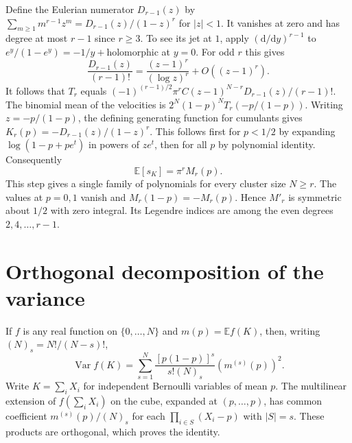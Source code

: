 \documentclass[11pt]{article}
\newcommand{\dd}{\mathrm d}
\newcommand{\Var}{\operatorname{Var}}
\newcommand{\E}{\mathbb E}
\begin{document}
Define the Eulerian numerator $D_{r-1}(z)$ by
$\sum_{m\ge1}m^{r-1}z^m=D_{r-1}(z)/(1-z)^r$ for $|z|<1$.
It vanishes at zero and has degree at most $r-1$ since $r\ge3$.
To see its jet at $1$, apply $(\dd/\dd y)^{r-1}$ to
$e^y/(1-e^y)=-1/y+\text{holomorphic}$ at $y=0$.
For odd $r$ this gives
\[
 \frac{D_{r-1}(z)}{(r-1)!}
 =\frac{(z-1)^r}{(\log z)^r}+O((z-1)^r).
\]
It follows that $T_r$ equals
$(-1)^{(r-1)/2}\pi^r C(z-1)^{N-r}D_{r-1}(z)/(r-1)!$.
The binomial mean of the velocities is
$2^N(1-p)^N T_r(-p/(1-p))$.
Writing $z=-p/(1-p)$, the defining generating function for cumulants
gives $K_r(p)=-D_{r-1}(z)/(1-z)^r$. This follows first for $p<1/2$
by expanding $\log(1-p+pe^t)$ in powers of $z e^t$, then for all
$p$ by polynomial identity. Consequently
\begin{equation}\label{eq:means}
            \E[s_K]=\pi^r M_r(p).
\end{equation}
This step gives a single family of polynomials for every cluster size
$N\ge r$. The values at $p=0,1$ vanish and $M_r(1-p)=-M_r(p)$.
Hence $M'_r$ is symmetric about $1/2$ with zero integral. Its
Legendre indices are among the even degrees $2,4,\ldots,r-1$.

\section{Orthogonal decomposition of the variance}
If $f$ is any real function on $\{0,\dots,N\}$ and
$m(p)=\E f(K)$, then, writing $(N)_s=N!/(N-s)!$,
\begin{equation}\label{eq:hoeffding}
 \Var f(K)=\sum_{s=1}^N\frac{[p(1-p)]^s}{s!(N)_s}
                   (m^{(s)}(p))^2 .
\end{equation}
Write $K=\sum_i X_i$ for independent Bernoulli variables of mean $p$.
The multilinear extension of $f(\sum_i X_i)$ on the cube, expanded
at $(p,\dots,p)$, has common coefficient $m^{(s)}(p)/(N)_s$ for
each $\prod_{i\in S}(X_i-p)$ with $|S|=s$. These products are orthogonal,
which proves the identity.
\end{document}
